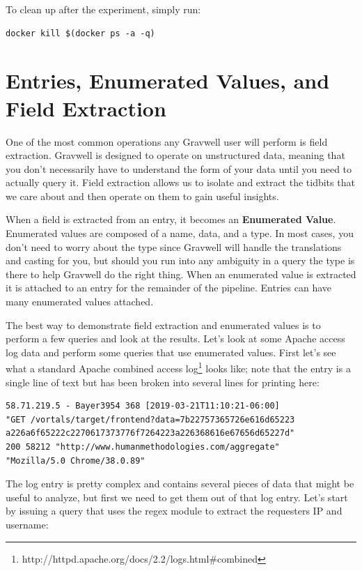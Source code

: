 To clean up after the experiment, simply run:

\begin{Verbatim}[breaklines=true]
docker kill $(docker ps -a -q)
\end{Verbatim}


\section{Entries, Enumerated Values, and Field Extraction}
One of the most common operations any Gravwell user will perform is
field extraction. Gravwell is designed to operate on unstructured data,
meaning that you don't necessarily have to understand the form of your data
until you need to actually query it. Field extraction allows us to
isolate and extract the tidbits that we care about and then operate on
them to gain useful insights.

When a field is extracted from an entry, it becomes an \textbf{Enumerated Value}.
Enumerated values are composed of a name, data, and a type. In
most cases, you don't need to worry about the type since Gravwell will
handle the translations and casting for you, but should you run into any
ambiguity in a query the type is there to help Gravwell do the right
thing. When an enumerated value is extracted it is attached to an
entry for the remainder of the pipeline. Entries can have many enumerated values attached.

The best way to demonstrate field extraction and enumerated values is
to perform a few queries and look at the results. Let's look at some
Apache access log data and perform some queries that use enumerated
values. First let's see what a standard Apache combined access
log\footnote{http://httpd.apache.org/docs/2.2/logs.html\#combined} looks like;
note that the entry is a single line of text but has been broken into
several lines for printing here:

\begin{Verbatim}[breaklines=true]
58.71.219.5 - Bayer3954 368 [2019-03-21T11:10:21-06:00] 
"GET /vortals/target/frontend?data=7b22757365726e616d65223
a226a6f65222c2270617373776f7264223a226368616e67656d65227d"
200 58212 "http://www.humanmethodologies.com/aggregate"
"Mozilla/5.0 Chrome/38.0.89"
\end{Verbatim}

The log entry is pretty complex and contains several pieces of data
that might be useful to analyze, but first we need to get them out of
that log entry. Let's start by issuing a query that uses the regex
module to extract the requesters IP and username:

